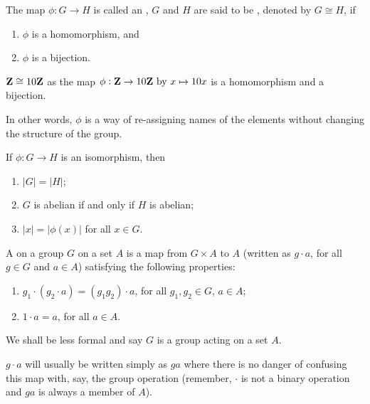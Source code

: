 \begin{definition}[Isomorphism]
The map $\phi:G\to H$ is called an , $G$ and $H$ are said to be , denoted by $G\cong H$, if
\begin{enumerate}[label=(\roman*)]
\item $\phi$ is a homomorphism, and
\item $\phi$ is a bijection.
\end{enumerate}
\end{definition}

\begin{example}
$\mathbf Z\cong10\mathbf Z$ as the map $\phi:\mathbf Z\to10\mathbf Z \text{ by } x \mapsto 10x$ is a homomorphism and a bijection.

In other words, $\phi$ is a way of re-assigning names of the elements without changing the structure of the group.
\end{example}

\begin{proposition}
If $\phi:G\to H$ is an isomorphism, then
\begin{enumerate}[label=(\arabic*)]
\item $|G|=|H|$;
\item $G$ is abelian if and only if $H$ is abelian;
\item $|x|=|\phi(x)|$ for all $x\in G$.
\end{enumerate}
\end{proposition}

\begin{definition}
A  on a group $G$ on a set $A$ is a map from $G\times A$ to $A$ (written as $g\cdot a$, for all $g\in G$ and $a\in A$) satisfying the following properties:
\begin{enumerate}[label=(\roman*)]
\item $g_1\cdot(g_2\cdot a)=(g_1g_2)\cdot a$, for all $g_1,g_2\in G$, $a\in A$;
\item $1\cdot a=a$, for all $a\in A$.
\end{enumerate}
\end{definition}

We shall be less formal and say $G$ is a group acting on a set $A$.

\begin{notation}
$g\cdot a$ will usually be written simply as $ga$ where there is no danger of confusing this map with, say, the group operation (remember, $\cdot$ is not a binary operation and $ga$ is always a member of $A$).
\end{notation}

